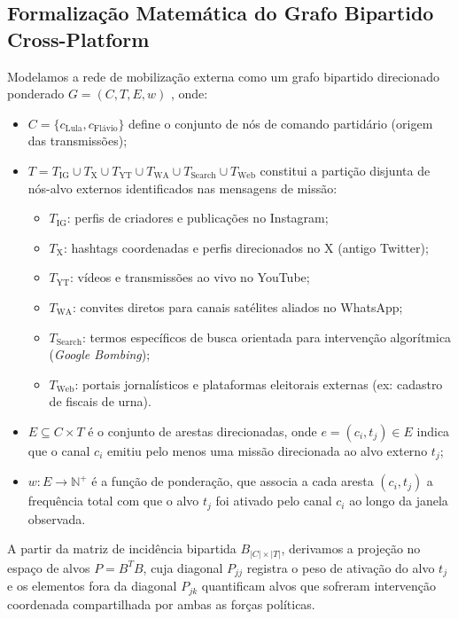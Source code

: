 \documentclass[12pt]{article}
\begin{document}
\subsection{Formalização Matemática do Grafo Bipartido Cross-Platform}
Modelamos a rede de mobilização externa como um grafo bipartido direcionado ponderado $G = (C, T, E, w)$ \cite{borgatti1997twomode,latapy2008twomode}, onde:
\begin{itemize}
    \item $C = \{c_{\text{Lula}}, c_{\text{Flávio}}\}$ define o conjunto de nós de comando partidário (origem das transmissões);
    \item $T = T_{\text{IG}} \cup T_{\text{X}} \cup T_{\text{YT}} \cup T_{\text{WA}} \cup T_{\text{Search}} \cup T_{\text{Web}}$ constitui a partição disjunta de nós-alvo externos identificados nas mensagens de missão:
    \begin{itemize}
        \item $T_{\text{IG}}$: perfis de criadores e publicações no Instagram;
        \item $T_{\text{X}}$: hashtags coordenadas e perfis direcionados no X (antigo Twitter);
        \item $T_{\text{YT}}$: vídeos e transmissões ao vivo no YouTube;
        \item $T_{\text{WA}}$: convites diretos para canais satélites aliados no WhatsApp;
        \item $T_{\text{Search}}$: termos específicos de busca orientada para intervenção algorítmica (\textit{Google Bombing});
        \item $T_{\text{Web}}$: portais jornalísticos e plataformas eleitorais externas (ex: cadastro de fiscais de urna).
    \end{itemize}
    \item $E \subseteq C \times T$ é o conjunto de arestas direcionadas, onde $e = (c_i, t_j) \in E$ indica que o canal $c_i$ emitiu pelo menos uma missão direcionada ao alvo externo $t_j$;
    \item $w: E \rightarrow \mathbb{N}^+$ é a função de ponderação, que associa a cada aresta $(c_i, t_j)$ a frequência total com que o alvo $t_j$ foi ativado pelo canal $c_i$ ao longo da janela observada.
\end{itemize}

A partir da matriz de incidência bipartida $B_{|C| \times |T|}$, derivamos a projeção no espaço de alvos $P = B^T B$, cuja diagonal $P_{jj}$ registra o peso de ativação do alvo $t_j$ e os elementos fora da diagonal $P_{jk}$ quantificam alvos que sofreram intervenção coordenada compartilhada por ambas as forças políticas.
\end{document}
